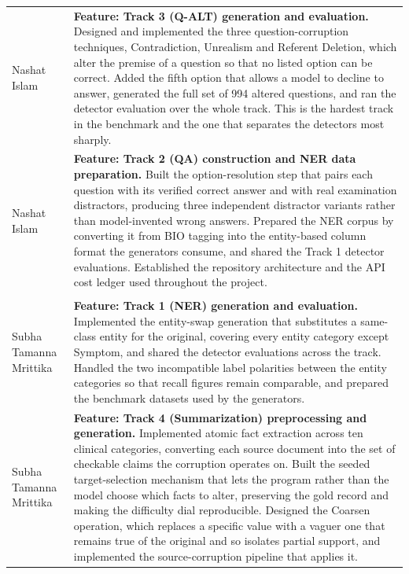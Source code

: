 \documentclass{iutbscthesis}
\begin{document}
\begin{appendices}
\begin{longtable}{|>{\centering\arraybackslash}m{3.0cm}|p{10.2cm}|}
\multicolumn{2}{|l|}{\textbf{Nashat Islam} \quad \small 220041211} \\
\hline
Nashat Islam &
\textbf{Feature: Track 3 (Q-ALT) generation and evaluation.}
Designed and implemented the three question-corruption techniques,
Contradiction, Unrealism and Referent Deletion, which alter the premise of a
question so that no listed option can be correct. Added the fifth option that
allows a model to decline to answer, generated the full set of 994 altered
questions, and ran the detector evaluation over the whole track. This is the
hardest track in the benchmark and the one that separates the detectors most
sharply. \\
\hline
Nashat Islam &
\textbf{Feature: Track 2 (QA) construction and NER data preparation.}
Built the option-resolution step that pairs each question with its verified
correct answer and with real examination distractors, producing three
independent distractor variants rather than model-invented wrong answers.
Prepared the NER corpus by converting it from BIO tagging into the entity-based
column format the generators consume, and shared the Track 1 detector
evaluations. Established the repository architecture and the API cost ledger
used throughout the project. \\
\hline

\multicolumn{2}{|l|}{\textbf{Subha Tamanna Mrittika} \quad \small 220041227} \\
\hline
Subha Tamanna Mrittika &
\textbf{Feature: Track 1 (NER) generation and evaluation.}
Implemented the entity-swap generation that substitutes a same-class entity for
the original, covering every entity category except Symptom, and shared the
detector evaluations across the track. Handled the two incompatible label
polarities between the entity categories so that recall figures remain
comparable, and prepared the benchmark datasets used by the generators. \\
\hline
Subha Tamanna Mrittika &
\textbf{Feature: Track 4 (Summarization) preprocessing and generation.}
Implemented atomic fact extraction across ten clinical categories, converting
each source document into the set of checkable claims the corruption operates
on. Built the seeded target-selection mechanism that lets the program rather
than the model choose which facts to alter, preserving the gold record and
making the difficulty dial reproducible. Designed the Coarsen operation, which
replaces a specific value with a vaguer one that remains true of the original
and so isolates partial support, and implemented the source-corruption pipeline
that applies it. \\
\hline


\end{longtable}
\end{appendices}
\end{document}
